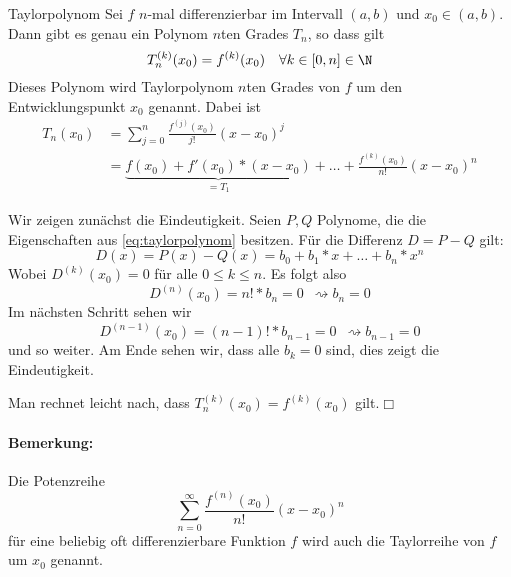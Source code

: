 \begin{lemma}{Taylorpolynom}
	Sei $f$ $n$-mal differenzierbar im Intervall $(a,b)$ und $x_0\in(a,b)$. Dann gibt es genau ein Polynom $n$ten Grades $T_n$, so dass gilt
	\begin{equation}\label{eq:taylorpolynom}
		T_n^{(k)}(x_0)=f^{(k)}(x_0) \quad\forall k\in[0,n]\in\N
	\end{equation}
	Dieses Polynom wird Taylorpolynom $n$ten Grades von $f$ um den Entwicklungspunkt $x_0$ genannt.
	Dabei ist
	\begin{align*}
		T_n(x_0)&=\sum\limits_{j=0}^n \frac{f^{(j)}(x_0)}{j!}(x-x_0)^j\\
		&=\underbrace{f(x_0)+f'(x_0)*(x-x_0)}_{=T_1}+\ldots+\frac{f^{(k)}(x_0)}{n!}(x-x_0)^n
	\end{align*}
\end{lemma}
\beweis
Wir zeigen zunächst die Eindeutigkeit. Seien $P,Q$ Polynome, die die Eigenschaften aus \autoref{eq:taylorpolynom} besitzen.
Für die Differenz $D=P-Q$ gilt:
\begin{equation*}
	D(x)=P(x)-Q(x)=b_0+b_1*x+\ldots+b_n*x^n
\end{equation*}
Wobei $D^{(k)}(x_0)=0$ für alle $0\leq k\leq n$. Es folgt also
\begin{equation*}
	D^{(n)}(x_0)=n!*b_n=0\enspace \rightsquigarrow b_n=0
\end{equation*}
Im nächsten Schritt sehen wir
\begin{equation*}
	D^{(n-1)}(x_0)=(n-1)!*b_{n-1}=0\enspace \rightsquigarrow b_{n-1}=0
\end{equation*}
und so weiter.
Am Ende sehen wir, dass alle $b_k=0$ sind, dies zeigt die Eindeutigkeit.

Man rechnet leicht nach, dass $T_n^{(k)}(x_0)=f^{(k)}(x_0)$ gilt.\hfill$\Box$

\paragraph{Bemerkung:}
Die Potenzreihe
\begin{equation*}
	\sum\limits_{n=0}^\infty \frac{f^{(n)}(x_0)}{n!}(x-x_0)^n
\end{equation*}
für eine beliebig oft differenzierbare Funktion $f$ wird auch die Taylorreihe von $f$ um $x_0$ genannt.

